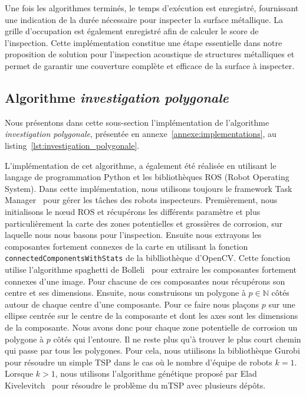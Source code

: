 \documentclass[francais,RandD]{rapportPFE}
\begin{document}
			Une fois les algorithmes terminés, le temps d'exécution est enregistré, fournissant une indication de la durée nécessaire pour inspecter la surface métallique.
			La grille d'occupation est également enregistré afin de calculer le score de l'inspection.
			Cette implémentation constitue une étape essentielle dans notre proposition de solution pour l'inspection acoustique de structures métalliques et permet de garantir une couverture complète et efficace de la surface à inspecter.
		\subsection*{Algorithme \textit{investigation polygonale}}
			Nous présentons dans cette sous-section l'implémentation de l'algorithme \textit{investigation polygonale}, présentée en annexe~\ref{annexe:implementations}, au listing~\ref{lst:investigation_polygonale}.

			L'implémentation de cet algorithme, a également été réalisée en utilisant le langage de programmation Python et les bibliothèques ROS (Robot Operating System).
			Dans cette implémentation, nous utilisons toujours le framework Task Manager~\cite{ROSTaskManager} pour gérer les tâches des robots inspecteurs.
			Premièrement, nous initialisons le nœud ROS et récupérons les différents paramètre et plus particulièrement la carte des zones potentielles et grossières de corrosion, sur laquelle nous nous basons pour l'inspection.
			Ensuite nous extrayons les composantes fortement connexes de la carte en utilisant la fonction \texttt{connectedComponentsWithStats} de la biblliothèque d'OpenCV.
			Cette fonction utilise l'algorithme spaghetti de Bolleli~\cite{BolelliSpaghetti} pour extraire les composantes fortement connexes d'une image.
			Pour chacune de ces composantes nous récupérons son centre et ses dimensions.
			Ensuite, nous construisons un polygone à $p \in \mathbb{N}$ côtés autour de chaque centre d'une composante.
			Pour ce faire nous plaçons $p$ sur une ellipse centrée sur le centre de la composante et dont les axes sont les dimensions de la composante.
			Nous avons donc pour chaque zone potentielle de corrosion un polygone à $p$ côtés qui l'entoure.
			Il ne reste plus qu'à trouver le plus court chemin qui passe par tous les polygones.
			Pour cela, nous utiilisons la bibliothèque Gurobi pour résoudre un simple TSP dans le cas où le nombre d'équipe de robots $k = 1$.
			Lorsque $k > 1$, nous utilisons l'algorithme génétique proposé par Elad Kivelevitch~\cite{MDMTSPV_GA} pour résoudre le problème du mTSP avec plusieurs dépôts.
\end{document}
